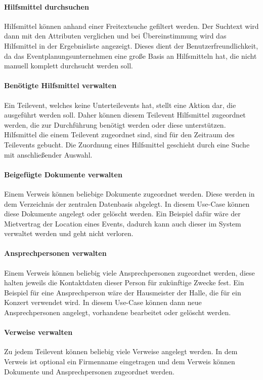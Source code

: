 \paragraph{Hilfsmittel durchsuchen}
Hilfsmittel können anhand einer Freitextsuche gefiltert werden. Der Suchtext wird dann mit den Attributen verglichen und bei Übereinstimmung wird das Hilfsmittel in der Ergebnisliste angezeigt. Dieses dient der Benutzerfreundlichkeit, da das Eventplanungsunternehmen eine große Basis an Hilfsmitteln hat, die nicht manuell komplett durchsucht werden soll.

\paragraph{Benötigte Hilfsmittel verwalten}
Ein Teilevent, welches keine Unterteilevents hat, stellt eine Aktion dar, die ausgeführt werden soll. Daher können diesem Teilevent Hilfsmittel zugeordnet werden, die zur Durchführung benötigt werden oder diese unterstützen. Hilfsmittel die einem Teilevent zugeordnet sind, sind für den Zeitraum des Teilevents gebucht. Die Zuordnung eines Hilfsmittel geschieht durch eine Suche mit anschließender Auswahl.

\paragraph{Beigefügte Dokumente verwalten}
Einem Verweis können beliebige Dokumente zugeordnet werden. Diese werden in dem Verzeichnis der zentralen Datenbasis abgelegt. In diesem Use-Case können diese Dokumente angelegt oder gelöscht werden. Ein Beispiel dafür wäre der Mietvertrag der Location eines Events, dadurch kann auch dieser im System verwaltet werden und geht nicht verloren.

\paragraph{Ansprechpersonen verwalten}
Einem Verweis können beliebig viele Ansprechpersonen zugeordnet werden, diese halten jeweils die Kontaktdaten dieser Person für zukünftige Zwecke fest. Ein Beispiel für eine Ansprechperson wäre der Hausmeister der Halle, die für ein Konzert verwendet wird. In diesem Use-Case können dann neue Ansprechpersonen angelegt, vorhandene bearbeitet oder gelöscht werden.

\paragraph{Verweise verwalten}
Zu jedem Teilevent können beliebig viele Verweise angelegt werden. In dem Verweis ist optional ein Firmenname eingetragen und dem Verweis können Dokumente und Ansprechpersonen zugeordnet werden.


